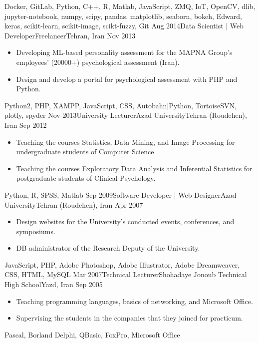 \begin{experiences}
{\begin{itemize}
    \end{itemize}
  }
    {Docker, GitLab, Python, C++, R, Matlab, JavaScript, ZMQ, IoT, OpenCV, dlib, jupyter-notebook, numpy, scipy, pandas, matplotlib, seaborn, bokeh, Edward, keras, scikit-learn, scikit-image, scikt-fuzzy, Git}
    \emptySeparator
  \experience
  {Aug 2014}{Data Scientist | Web Developer}{Freelancer}{Tehran, Iran}
  {Nov 2013} {
    \begin{itemize}
      \item Developing ML-based personality assessment for the MAPNA Group's employees' (20000+) psychological assessment (Iran).

      \item Design and develop a portal for psychological assessment with PHP and Python.
    \end{itemize}
  }
    {Python2, PHP, XAMPP, JavaScript, CSS, Autobahn|Python, TortoiseSVN, plotly, spyder}
    \emptySeparator
  \experience
  {Nov 2013}{University Lecturer}{Azad University}{Tehran (Roudehen), Iran}
  {Sep 2012} {
    \begin{itemize}
      \item Teaching the courses Statistics, Data Mining, and Image Processing for undergraduate students of Computer Science.

      \item Teaching the courses Exploratory Data Analysis and Inferential Statistics for postgraduate students of Clinical Psychology.
    \end{itemize}
  }
    {Python, R, SPSS, Matlab}
    \emptySeparator
  \experience
  {Sep 2009}{Software Developer | Web Designer}{Azad University}{Tehran (Roudehen), Iran}
  {Apr 2007} {
    \begin{itemize}
      \item Design websites for the University's conducted events, conferences, and symposiums.

      \item DB administrator of the Research Deputy of the University.
    \end{itemize}
  }
    {JavaScript, PHP, Adobe Photoshop, Adobe Illustrator, Adobe Dreamweaver, CSS, HTML, MySQL}
    \emptySeparator
  \experience
  {Mar 2007}{Technical Lecturer}{Shohadaye Jonoub Technical High School}{Yazd, Iran}
  {Sep 2005} {
    \begin{itemize}
      \item Teaching programming languages, basics of networking, and Microsoft Office.

      \item Supervising the students in the companies that they joined for practicum.
    \end{itemize}
  }
    {Pascal, Borland Delphi, QBasic, FoxPro, Microsoft Office}
\end{experiences}
